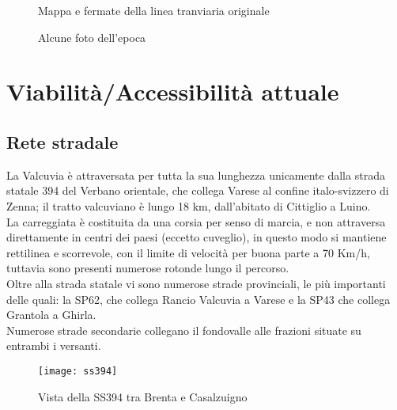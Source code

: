 \documentclass{article}
\begin{document}
\begin{figure}[H]
\qquad
{}
\caption{Mappa e fermate della linea tranviaria originale  \cite{wiki}}
\end{figure}

\begin{figure}[H]
\qquad
{}
\qquad
{}
\qquad
{}
\caption{Alcune foto dell'epoca  \cite{wiki}}
\end{figure}


\section{Viabilità/Accessibilità attuale}

\subsection{Rete stradale} 
La Valcuvia è attraversata per tutta la sua lunghezza unicamente dalla strada statale 394 del Verbano orientale, che collega Varese al confine italo-svizzero di Zenna; il tratto valcuviano è lungo 18 km, dall'abitato di Cittiglio a Luino.\\
La carreggiata è costituita da una corsia per senso di marcia, e non attraversa direttamente in centri dei paesi (eccetto cuveglio), in questo modo si mantiene rettilinea e scorrevole, con il limite di velocità per buona parte a 70 Km/h, tuttavia sono presenti numerose rotonde lungo il percorso.\\
Oltre alla strada statale vi sono numerose strade provinciali, le più importanti delle quali: la SP62, che collega Rancio Valcuvia a Varese e la SP43 che collega Grantola a Ghirla.\\
Numerose strade secondarie collegano il fondovalle alle frazioni situate su entrambi i versanti.
\begin{figure}[H]
\centering
\texttt{[image: ss394]}
\caption{Vista della SS394 tra Brenta e Casalzuigno \cite{gmaps}} 
\end{figure}
\end{document}
